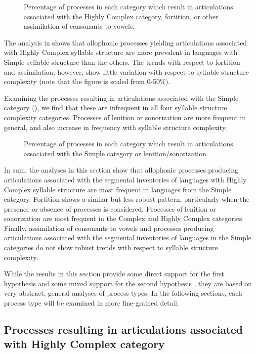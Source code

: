 \begin{figure}
\caption{\label{fig:7.4} Percentage of processes in each category which result in articulations associated with the Highly Complex category, fortition, or other assimilation of consonants to vowels.}
\end{figure}

  The analysis in  shows that allophonic processes yielding articulations associated with Highly Complex syllable structure are more prevalent in languages with Simple syllable structure than the others. The trends with respect to fortition and assimilation, however, show little variation with respect to syllable structure complexity (note that the figure is scaled from 0-50\%).

  Examining the processes resulting in articulations associated with the Simple category (), we find that these are infrequent in all four syllable structure complexity categories. Processes of lenition or sonorization are more frequent in general, and also increase in frequency with syllable structure complexity.

\begin{figure}
\caption{\label{fig:7.5} Percentage of processes in each category which result in articulations associated with the Simple category or lenition/sonorization.}
\end{figure}

  In sum, the analyses in this section show that allophonic processes producing articulations associated with the segmental inventories of languages with Highly Complex syllable structure are most frequent in languages from the Simple category. Fortition shows a similar but less robust pattern, particularly when the presence or absence of processes is considered. Processes of lenition or sonorization are most frequent in the Complex and Highly Complex categories. Finally, assimilation of consonants to vowels and processes producing articulations associated with the segmental inventories of languages in the Simple categories do not show robust trends with respect to syllable structure complexity.

  While the results in this section provide some direct support for the first hypothesis  and some mixed support for the second hypothesis , they are based on very abstract, general analyses of process types. In the following sections, each process type will be examined in more fine-grained detail.

\subsection{Processes resulting in articulations associated with Highly Complex category}\label{sec:7.3.2}

